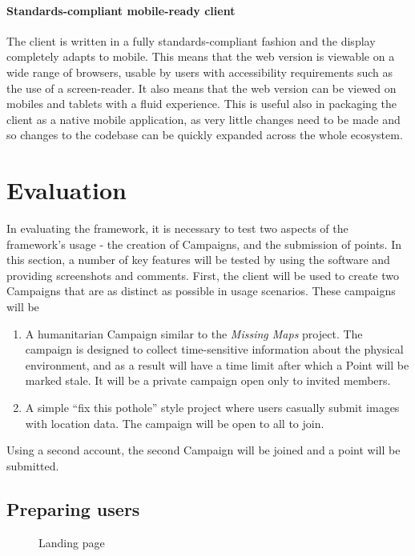 \documentclass{article}
\let\oldsection\section
\renewcommand\section{\clearpage\oldsection}
\begin{document}
	\paragraph{Standards-compliant mobile-ready client}
	The client is written in a fully standards-compliant fashion and the display completely adapts to mobile. This means that the web version is viewable on a wide range of browsers, usable by users with accessibility requirements such as the use of a screen-reader. It also means that the web version can be viewed on mobiles and tablets with a fluid experience. This is useful also in packaging the client as a native mobile application, as very little changes need to be made and so changes to the codebase can be quickly expanded across the whole ecosystem.

	\section{Evaluation}
	\label{sec:evaluation}

		In evaluating the framework, it is necessary to test two aspects of the framework's usage - the creation of Campaigns, and the submission of points. In this section, a number of key features will be tested by using the software and providing screenshots and comments. First, the client will be used to create two Campaigns that are as distinct as possible in usage scenarios. These campaigns will be

		\begin{enumerate}[label=\Alph*.]
			\item A humanitarian Campaign similar to the \emph{Missing Maps} project. The campaign is designed to collect time-sensitive information about the physical environment, and as a result will have a time limit after which a Point will be marked stale. It will be a private campaign open only to invited members.
			\item A simple ``fix this pothole'' style project where users casually submit images with location data. The campaign will be open to all to join.
		\end{enumerate}

		Using a second account, the second Campaign will be joined and a point will be submitted.

		\subsection{Preparing users}

		\begin{figure}[ht]
			\centering
			\caption{Landing page}
			\label{fig:eval-prep-1}
		\end{figure}
\end{document}
